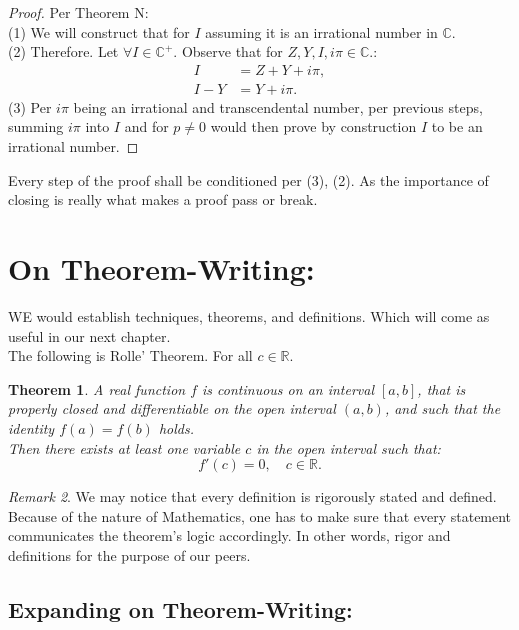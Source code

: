 \documentclass[10pt]{article}
\theoremstyle{plain}
\newtheorem{theorem}{Theorem}[section]
\theoremstyle{definition}
\theoremstyle{remark}
\newtheorem{remark}[theorem]{Remark}
\begin{document}
\begin{proof}
	Per Theorem N:\\
	(1) We will construct that for $I$ assuming it is an irrational number in $\mathbb{C}$.\\
	(2) Therefore. Let $\forall I \in \mathbb{C}^{+}.$ Observe that for $Z, Y, I, i\pi \in \mathbb{C}.$:
	\begin{align*}
		I &= Z+Y+i\pi,\\
		I-Y &= Y+i\pi.
	\end{align*}
	(3) Per $i\pi$ being an irrational and transcendental number, per previous steps, summing $i\pi$ into $I$ and for $p \neq 0$ would then prove by construction $I$ to be an irrational number.
\end{proof}
Every step of the proof shall be conditioned per (3), (2). As the importance of closing is really what makes a proof pass or break.

\section{On Theorem-Writing:}

\lettrine[lines=2, lhang=0.1, loversize=0.2]{W}E would establish techniques, theorems, and definitions. Which will come as useful in our next chapter.\\
The following is Rolle' Theorem. For all $c \in \mathbb{R}.$

\begin{theorem}
	A real function $f$ is continuous on an interval $[a, b]$, that is properly closed and differentiable on the open interval $(a, b)$, and such that the identity $f(a) = f(b)$ holds.\\Then there exists at least one variable $c$ in the open interval such that:
	\begin{equation}
		f'(c) = 0, \quad c \in \mathbb{R}.
	\end{equation}
\end{theorem}

\begin{remark}
We may notice that every definition is rigorously stated and defined. Because of the nature of Mathematics, one has to make sure that every statement communicates the theorem's logic accordingly. In other words, rigor and definitions for the purpose of our peers.
\end{remark}

\subsection{Expanding on Theorem-Writing:}
\end{document}
